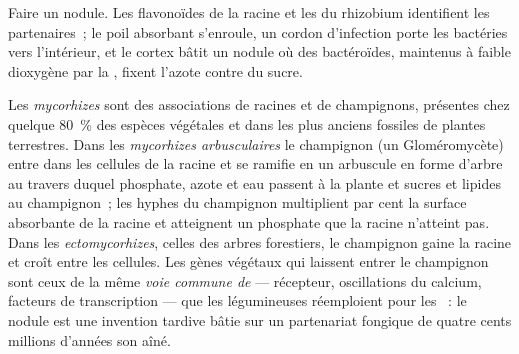 \begin{omfigure}
{\small Faire un nodule. Les flavonoïdes de la racine et les  du rhizobium identifient les partenaires~; le poil absorbant
s'enroule, un cordon d'infection porte les bactéries vers l'intérieur,
et le cortex bâtit un nodule où des bactéroïdes, maintenus à faible
dioxygène par la , fixent l'azote contre du sucre.}
\end{omfigure}

\begin{definition}\label{def:b3:microbiomes:mycorrhiza}
Les \emph{mycorhizes} sont des associations de racines et de
champignons, présentes chez quelque \qty{80}{\%} des espèces végétales
et dans les plus anciens fossiles de plantes terrestres. Dans les
\emph{mycorhizes arbusculaires} le champignon (un Gloméromycète) entre
dans les cellules de la racine et se ramifie en un arbuscule en forme
d'arbre au travers duquel phosphate, azote et eau passent à la plante
et sucres et lipides au champignon~; les hyphes du champignon
multiplient par cent la surface absorbante de la racine et atteignent
un phosphate que la racine n'atteint pas. Dans les
\emph{ectomycorhizes}, celles des arbres forestiers, le champignon
gaine la racine et croît entre les cellules. Les gènes végétaux qui
laissent entrer le champignon sont ceux de la même \emph{voie commune
de } --- récepteur, oscillations du calcium, facteurs de
transcription --- que les légumineuses réemploient pour les
~: le nodule est une invention tardive bâtie sur un
partenariat fongique de quatre cents millions d'années son aîné.
\end{definition}


